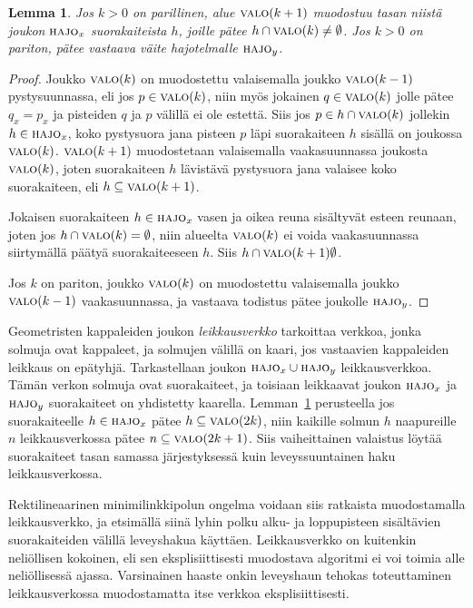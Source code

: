 \documentclass[finnish]{tktltiki2}
\newtheorem{lem}[lau]{Lemma}
\theoremstyle{definition}
\theoremstyle{remark}
\newcommand\reach[1]{\ensuremath{\textsc{valo}(#1)}\xspace}
\newcommand\decomp[1]{\ensuremath{\textsc{hajo}_{#1}}\xspace}
\begin{document}
\begin{lem}\label{lem:valaisu}
Jos $k>0$ on parillinen, alue \reach{k+1} muodostuu tasan niistä joukon \decomp{x} suorakaiteista $h$, joille pätee $h\cap\reach{k}\neq\emptyset$.
Jos $k>0$ on pariton, pätee vastaava väite hajotelmalle \decomp{y}.
\end{lem}
\begin{proof}
Joukko \reach{k} on muodostettu valaisemalla joukko \reach{k-1} pystysuunnassa, eli jos $p\in\reach{k}$, niin myös jokainen $q\in\reach{k}$ jolle pätee $q_x=p_x$ ja pisteiden $q$ ja $p$ välillä ei ole estettä.
Siis jos $p\in h\cap\reach{k}$ jollekin $h\in\decomp{x}$, koko pystysuora jana pisteen $p$ läpi suorakaiteen $h$ sisällä on joukossa \reach{k}.
\reach{k+1} muodostetaan valaisemalla vaakasuunnassa joukosta \reach{k}, joten suorakaiteen $h$ lävistävä pystysuora jana valaisee koko suorakaiteen, eli $h\subseteq\reach{k+1}$.

Jokaisen suorakaiteen $h\in\decomp{x}$ vasen ja oikea reuna sisältyvät esteen reunaan, joten jos $h\cap\reach{k}=\emptyset$, niin alueelta \reach{k} ei voida vaakasuunnassa siirtymällä päätyä suorakaiteeseen $h$.
Siis $h\cap\reach{k+1}\emptyset$.

Jos $k$ on pariton, joukko \reach{k} on muodostettu valaisemalla joukko \reach{k-1} vaakasuunnassa, ja vastaava todistus pätee joukolle \decomp{y}.
\end{proof}

Geometristen kappaleiden joukon \emph{leikkausverkko} tarkoittaa verkkoa, jonka solmuja ovat kappaleet, ja solmujen välillä on kaari, jos vastaavien kappaleiden leikkaus on epätyhjä.
Tarkastellaan joukon $\decomp{x}\cup\decomp{y}$ leikkausverkkoa.
Tämän verkon solmuja ovat suorakaiteet, ja toisiaan leikkaavat joukon \decomp{x} ja \decomp{y} suorakaiteet on yhdistetty kaarella.
Lemman~\ref{lem:valaisu} perusteella jos suorakaiteelle $h\in\decomp{x}$ pätee $h\subseteq\reach{2k}$, niin kaikille solmun $h$ naapureille $n$ leikkausverkossa pätee $n\subseteq\reach{2k+1}$.
Siis vaiheittainen valaistus löytää suorakaiteet tasan samassa järjestyksessä kuin leveyssuuntainen haku leikkausverkossa.

Rektilineaarinen minimilinkkipolun ongelma voidaan siis ratkaista muodostamalla leikkausverkko, ja etsimällä siinä lyhin polku alku- ja loppupisteen sisältävien suorakaiteiden välillä leveyshakua käyttäen.
Leikkausverkko on kuitenkin neliöllisen kokoinen, eli sen eksplisiittisesti muodostava algoritmi ei voi toimia alle neliöllisessä ajassa.
Varsinainen haaste onkin leveyshaun tehokas toteuttaminen leikkausverkossa muodostamatta itse verkkoa eksplisiittisesti.
\end{document}
